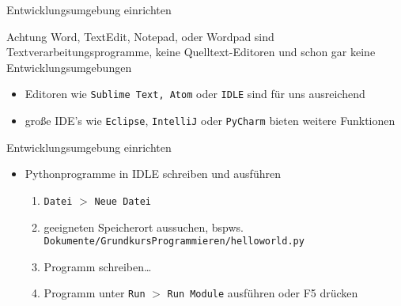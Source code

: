 \begin{frame}{Entwicklungsumgebung einrichten}
    \begin{alertblock}{Achtung}
        Word, TextEdit, Notepad, oder Wordpad sind Textverarbeitungsprogramme, keine 
        Quelltext-Editoren und schon gar keine Entwicklungsumgebungen
    \end{alertblock}
    \pause{}
    \begin{itemize}
        \item Editoren wie \texttt{Sublime Text, Atom} oder \texttt{IDLE} sind 
        für uns ausreichend
        \item große IDE's wie \texttt{Eclipse}, \texttt{IntelliJ} oder \texttt{PyCharm} 
        bieten weitere Funktionen
    \end{itemize}
\end{frame}

\begin{frame}{Entwicklungsumgebung einrichten}
    \begin{itemize}
        \item Pythonprogramme in IDLE schreiben und ausführen
            \begin{enumerate}
                \item\texttt{Datei} $>$ \texttt{Neue Datei}
                \item geeigneten Speicherort aussuchen, bspws. \texttt{Dokumente/GrundkursProgrammieren/helloworld.py}
                \item Programm schreiben\dots
                \item Programm unter \texttt{Run} $>$ \texttt{Run Module} ausführen oder F5 drücken
            \end{enumerate}
    \end{itemize}
\end{frame}


